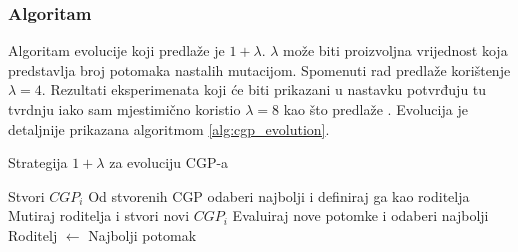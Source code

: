 \subsubsection{Algoritam}
Algoritam evolucije koji predlaže \cite{cgp} je $1 + \lambda$.
$\lambda$ može biti proizvoljna vrijednost koja predstavlja broj potomaka nastalih mutacijom.
Spomenuti rad predlaže korištenje $\lambda = 4$.
Rezultati eksperimenata koji će biti prikazani u nastavku potvrđuju tu tvrdnju iako sam mjestimično koristio $\lambda = 8$ kao što predlaže \cite{Sekanina2011}.
Evolucija je detaljnije prikazana algoritmom \ref{alg:cgp_evolution}.

\begin{algorithm}
	\caption{Strategija $1 + \lambda$ za evoluciju CGP-a}
	\label{alg:cgp_evolution}
	\begin{algorithmic}
			\STATE Stvori $CGP_i$
		\ENDFOR
		\STATE Od stvorenih CGP odaberi najbolji i definiraj ga kao roditelja
				\STATE Mutiraj roditelja i stvori novi $CGP_i$
			\ENDFOR
			\STATE Evaluiraj nove potomke i odaberi najbolji
				\STATE Roditelj $\leftarrow$ Najbolji potomak
			\ENDIF
		\ENDWHILE
	\end{algorithmic}
\end{algorithm}
